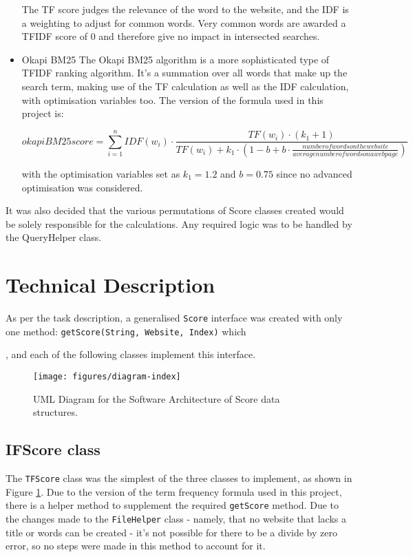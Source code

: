 \begin{itemize}
The TF score judges the relevance of the word to the website, and the IDF is a weighting to adjust for common words.
Very common words are awarded a TFIDF score of 0 and therefore give no impact in intersected searches.

\item Okapi BM25
The Okapi BM25 algorithm is a more sophisticated type of TFIDF ranking algorithm.
It's a summation over all words that make up the search term, making use of the TF calculation as well as the IDF calculation, with optimisation variables too.
The version of the formula used in this project is:

\begin{equation*}
    okapi BM 25 score = \sum_{i=1}^n IDF(w_i) \cdot \frac{TF(w_i)\cdot (k_1 + 1)}{TF(w_i) + k_1\cdot(1 - b + b\cdot \frac{number of words on the website}{average number of words on a webpage})}
\end{equation*}

with the optimisation variables set as $k_1 = 1.2$ and $b = 0.75$ since no advanced optimisation was considered.
\end{itemize}

It was also decided that the various permutations of Score classes created would be solely responsible for the calculations.
Any required logic was to be handled by the QueryHelper class.

\section{Technical Description}
As per the task description, a generalised {\tt Score} interface was created with only one method: {\tt getScore(String, Website, Index)} which


, and each of the following classes implement this interface.

\begin{figure}[t]
    \centering
    \texttt{[image: figures/diagram-index]}
    \caption{UML Diagram for the Software Architecture of Score data structures.}
    \label{fig:score:uml}
\end{figure}

\subsection{IFScore class}
The {\tt TFScore} class was the simplest of the three classes to implement, as shown in Figure \ref{fig:score:uml}.
Due to the version of the term frequency formula used in this project, there is a helper method to supplement the required {\tt getScore} method.
Due to the changes made to the {\tt FileHelper} class - namely, that no website that lacks a title or words can be created - it's not possible
for there to be a divide by zero error, so no steps were made in this method to account for it.

